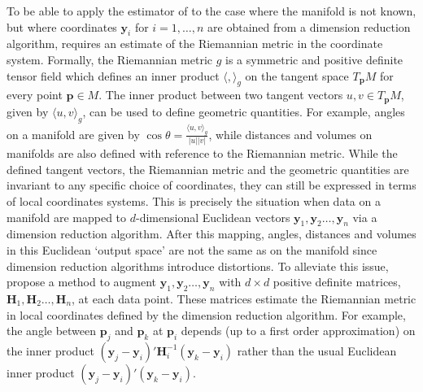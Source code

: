 \documentclass[11pt,a4paper,]{article}
\begin{document}
To be able to apply the estimator of \textcite{Pelletier2005-vu} to the case where the manifold is not known, but where coordinates \(\pmb{y}_i\) for \(i=1,\dots,n\) are obtained from a dimension reduction algorithm, requires an estimate of the Riemannian metric in the coordinate system. Formally, the Riemannian metric \(g\) is a symmetric and positive definite tensor field which defines an inner product \(\langle,\rangle_g\) on the tangent space \(T_{\pmb{p}} M\) for every point \(\pmb{p} \in M\). The inner product between two tangent vectors \(u,v \in T_{\pmb{p}}M\), given by \(\langle u,v \rangle_g\), can be used to define geometric quantities. For example, angles on a manifold are given by \(\cos{\theta}=\frac{\langle u,v \rangle_g}{|u| |v|}\), while distances and volumes on manifolds are also defined with reference to the Riemannian metric. While the defined tangent vectors, the Riemannian metric and the geometric quantities are invariant to any specific choice of coordinates, they can still be expressed in terms of local coordinates systems. This is precisely the situation when data on a manifold are mapped to \(d\)-dimensional Euclidean vectors \(\pmb{y}_1,\pmb{y}_2\dots,\pmb{y}_n\) via a dimension reduction algorithm. After this mapping, angles, distances and volumes in this Euclidean `output space' are not the same as on the manifold since dimension reduction algorithms introduce distortions. To alleviate this issue, \textcite{Perrault-Joncas2013-pq} propose a method to augment \(\pmb{y}_1,\pmb{y}_2\dots,\pmb{y}_n\) with \(d\times d\) positive definite matrices, \(\pmb{H}_1,\pmb{H}_2\dots,\pmb{H}_n\), at each data point. These matrices estimate the Riemannian metric in local coordinates defined by the dimension reduction algorithm. For example, the angle between \(\pmb{p}_j\) and \(\pmb{p}_k\) at \(\pmb{p}_i\) depends (up to a first order approximation) on the inner product \((\pmb{y}_j-\pmb{y}_i)'\pmb{H}^{-1}_i(\pmb{y}_k-\pmb{y}_i)\) rather than the usual Euclidean inner product \((\pmb{y}_j-\pmb{y}_i)'(\pmb{y}_k-\pmb{y}_i)\).
\end{document}
